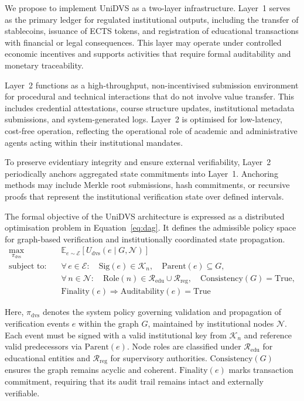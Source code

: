\documentclass[oneside,10pt]{swissi}
\begin{document}
We propose to implement UniDVS as a two-layer infrastructure. Layer~1 serves as the primary ledger for regulated institutional outputs, including the transfer of stablecoins, issuance of ECTS tokens, and registration of educational transactions with financial or legal consequences. This layer may operate under controlled economic incentives and supports activities that require formal auditability and monetary traceability.

Layer~2 functions as a high-throughput, non-incentivised submission environment for procedural and technical interactions that do not involve value transfer. This includes credential attestations, course structure updates, institutional metadata submissions, and system-generated logs. Layer~2 is optimised for low-latency, cost-free operation, reflecting the operational role of academic and administrative agents acting within their institutional mandates.

To preserve evidentiary integrity and ensure external verifiability, Layer~2 periodically anchors aggregated state commitments into Layer~1. Anchoring methods may include Merkle root submissions, hash commitments, or recursive proofs that represent the institutional verification state over defined intervals.

The formal objective of the UniDVS architecture is expressed as a distributed optimisation problem in Equation~\ref{eq:dag}. It defines the admissible policy space for graph-based verification and institutionally coordinated state propagation.
\begin{align}
\label{eq:dag}
\max_{\pi_{\text{dvs}}} \quad & \mathbb{E}_{e \sim \mathcal{E}} \left[ U_{\text{dvs}}(e \mid G, \mathcal{N}) \right] \\
\text{subject to:} \quad
& \forall\, e \in \mathcal{E}: \quad \text{Sig}(e) \in \mathcal{K}_n, \quad \text{Parent}(e) \subseteq G, \nonumber \\
& \forall\, n \in \mathcal{N}: \quad \text{Role}(n) \in \mathcal{R}_{\text{edu}} \cup \mathcal{R}_{\text{reg}}, \quad \text{Consistency}(G) = \text{True}, \nonumber \\
& \text{Finality}(e) \Rightarrow \text{Auditability}(e) = \text{True} \nonumber
\end{align}

Here, $\pi_{\text{dvs}}$ denotes the system policy governing validation and propagation of verification events $e$ within the graph $G$, maintained by institutional nodes $\mathcal{N}$. Each event must be signed with a valid institutional key from $\mathcal{K}_n$ and reference valid predecessors via $\text{Parent}(e)$. Node roles are classified under $\mathcal{R}_{\text{edu}}$ for educational entities and $\mathcal{R}_{\text{reg}}$ for supervisory authorities. $\text{Consistency}(G)$ ensures the graph remains acyclic and coherent. $\text{Finality}(e)$ marks transaction commitment, requiring that its audit trail remains intact and externally verifiable.
\end{document}
